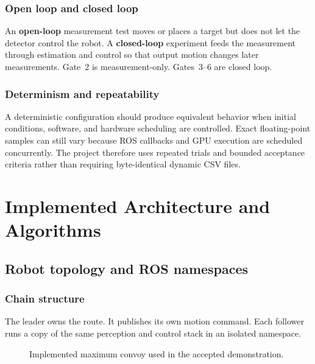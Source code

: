 \documentclass[11pt,oneside,openany]{book}
\newcommand{\term}[1]{\textbf{#1}\index{#1}}
\begin{document}
\section{Open loop and closed loop}

An \term{open-loop} measurement test moves or places a target but does not let the detector control the robot. A \term{closed-loop} experiment feeds the measurement through estimation and control so that output motion changes later measurements. Gate~2 is measurement-only. Gates~3--6 are closed loop.

\section{Determinism and repeatability}

A deterministic configuration should produce equivalent behavior when initial conditions, software, and hardware scheduling are controlled. Exact floating-point samples can still vary because ROS callbacks and GPU execution are scheduled concurrently. The project therefore uses repeated trials and bounded acceptance criteria rather than requiring byte-identical dynamic CSV files.

\part{Implemented Architecture and Algorithms}

\chapter{Robot topology and ROS namespaces}

\section{Chain structure}

The leader owns the route. It publishes its own motion command. Each follower runs a copy of the same perception and control stack in an isolated namespace.

\begin{figure}[htbp]
\centering
{}
\caption{Implemented maximum convoy used in the accepted demonstration.}
\end{figure}
\end{document}
